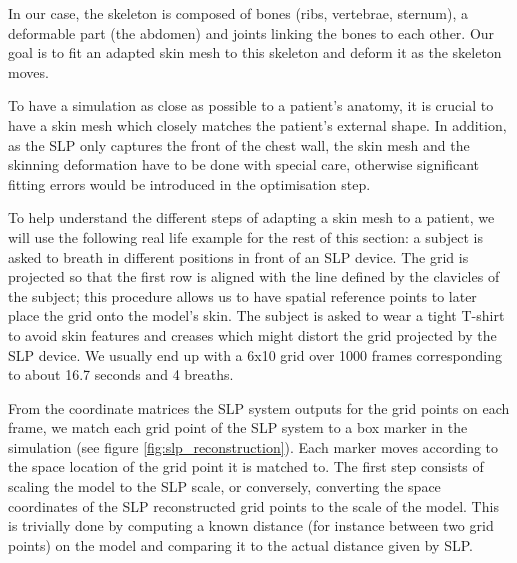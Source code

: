 In our case, the skeleton is composed of bones (ribs, vertebrae, sternum), a deformable part (the abdomen) and joints linking the bones to each other. Our goal is to fit an adapted skin mesh to this skeleton and deform it as the skeleton moves.

To have a simulation as close as possible to a patient's anatomy, it is crucial to have a skin mesh which closely matches the patient's external shape. In addition, as the SLP only captures the front of the chest wall, the skin mesh and the skinning deformation have to be done with special care, otherwise significant fitting errors would be introduced in the optimisation step.

To help understand the different steps of adapting a skin mesh to a patient, we will use the following real life example for the rest of this section: a subject is asked to breath in different positions in front of an SLP device. The grid is projected so that the first row is aligned with the line defined by the clavicles of the subject; this procedure allows us to have spatial reference points to later place the grid onto the model's skin. The subject is asked to wear a tight T-shirt to avoid skin features and creases which might distort the grid projected by the SLP device. We usually end up with a 6x10 grid over 1000 frames corresponding to about 16.7 seconds and 4 breaths.

From the coordinate matrices the SLP system outputs for the grid points on each frame, we match each grid point of the SLP system to a box marker in the simulation (see figure \ref{fig:slp_reconstruction}). Each marker moves according to the space location of the grid point it is matched to. The first step consists of scaling the model to the SLP scale, or conversely, converting the space coordinates of the SLP reconstructed grid points to the scale of the model. This is trivially done by computing a known distance (for instance between two grid points) on the model and comparing it to the actual distance given by SLP.

